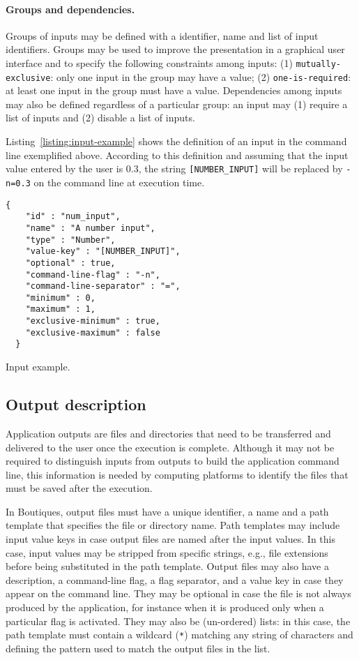 \documentclass{article}
\newcommand{\boutiques}{Boutiques\xspace}
\begin{document}
\paragraph{Groups and dependencies.} Groups of inputs may be defined
with a identifier, name and list of input identifiers. Groups may be
used to improve the presentation in a graphical user interface and to
specify the following constraints among inputs: (1)
\texttt{mutually-exclusive}: only one input in the group may have a
value; (2) \texttt{one-is-required}: at least one input in the group
must have a value. Dependencies among inputs may also be defined
regardless of a particular group: an input may (1) require a list of
inputs and (2) disable a list of inputs.

Listing~\ref{listing:input-example} shows the definition of an input
in the command line exemplified above. According to this definition
and assuming that the input value entered by the user is 0.3, the
string \texttt{[NUMBER\_INPUT]} will be replaced by \texttt{-n=0.3} on
the command line at execution time.
\begin{listing}
\begin{verbatim}
{
    "id" : "num_input",
    "name" : "A number input",
    "type" : "Number",
    "value-key" : "[NUMBER_INPUT]",
    "optional" : true,
    "command-line-flag" : "-n",
    "command-line-separator" : "=",
    "minimum" : 0,
    "maximum" : 1,
    "exclusive-minimum" : true,
    "exclusive-maximum" : false
  }
\end{verbatim}
\caption{Input example.} 
\label{listing:input-example}
\end{listing}

\subsection{Output description}

Application outputs are files and directories that need to be
transferred and delivered to the user once the execution is
complete. Although it may not be required to distinguish inputs from
outputs to build the application command line, this information is
needed by computing platforms to identify the files that must be saved
after the execution.

In \boutiques, output files must have a unique identifier, a name and
a path template that specifies the file or directory name. Path
templates may include input value keys in case output files are named
after the input values. In this case, input values may be stripped
from specific strings, e.g., file extensions before being substituted
in the path template. Output files may also have a description, a
command-line flag, a flag separator, and a value key in case they
appear on the command line. They may be optional in case the file is
not always produced by the application, for instance when it is
produced only when a particular flag is activated. They may also be
(un-ordered) lists: in this case, the path template must contain a
wildcard (\texttt{*}) matching any string of characters and defining
the pattern used to match the output files in the list.
\end{document}
